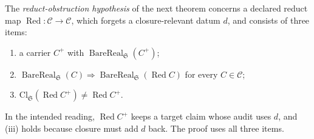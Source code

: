 The \emph{reduct-obstruction hypothesis} of the next theorem concerns a
declared reduct map \(\operatorname{Red}:\mathcal C\to\mathcal C\), which forgets
a closure-relevant datum \(d\), and consists of three items:
\begin{enumerate}[label=(\roman*),topsep=2pt,itemsep=1pt]
  \item a carrier \(C^{+}\) with \(\operatorname{BareReal}_{\mathfrak S}(C^{+})\);
  \item \(\operatorname{BareReal}_{\mathfrak S}(C)\Rightarrow
    \operatorname{BareReal}_{\mathfrak S}(\operatorname{Red}C)\) for every
    \(C\in\mathcal C\);
  \item \(\mathrm{Cl}_{\mathfrak S}(\operatorname{Red}C^{+})\ne\operatorname{Red}C^{+}\).
\end{enumerate}
In the intended reading, \(\operatorname{Red}C^{+}\) keeps a target claim whose
audit uses \(d\), and (iii) holds because closure must add \(d\) back. The
proof uses all three items.

